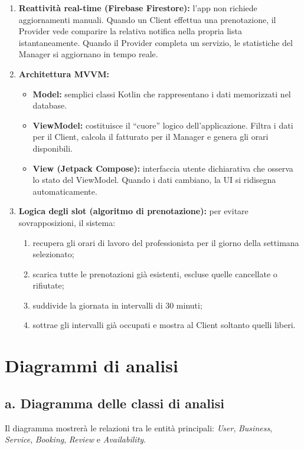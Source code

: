 \documentclass[12pt]{article}
\begin{document}
\begin{enumerate}
    \item \textbf{Reattività real-time (Firebase Firestore):} l'app non richiede aggiornamenti manuali. Quando un Client effettua una prenotazione, il Provider vede comparire la relativa notifica nella propria lista istantaneamente. Quando il Provider completa un servizio, le statistiche del Manager si aggiornano in tempo reale.

    \item \textbf{Architettura MVVM:}
    \begin{itemize}
        \item \textbf{Model:} semplici classi Kotlin che rappresentano i dati memorizzati nel database.
        \item \textbf{ViewModel:} costituisce il ``cuore'' logico dell'applicazione. Filtra i dati per il Client, calcola il fatturato per il Manager e genera gli orari disponibili.
        \item \textbf{View (Jetpack Compose):} interfaccia utente dichiarativa che osserva lo stato del ViewModel. Quando i dati cambiano, la UI si ridisegna automaticamente.
    \end{itemize}

    \item \textbf{Logica degli slot (algoritmo di prenotazione):} per evitare sovrapposizioni, il sistema:
    \begin{enumerate}[label=\roman*.]
        \item recupera gli orari di lavoro del professionista per il giorno della settimana selezionato;
        \item scarica tutte le prenotazioni già esistenti, escluse quelle cancellate o rifiutate;
        \item suddivide la giornata in intervalli di 30 minuti;
        \item sottrae gli intervalli già occupati e mostra al Client soltanto quelli liberi.
    \end{enumerate}
\end{enumerate}

\newpage
\section{Diagrammi di analisi}
\subsection{a. Diagramma delle classi di analisi}
Il diagramma mostrerà le relazioni tra le entità principali: \textit{User}, \textit{Business}, \textit{Service}, \textit{Booking}, \textit{Review} e \textit{Availability}.
\end{document}
